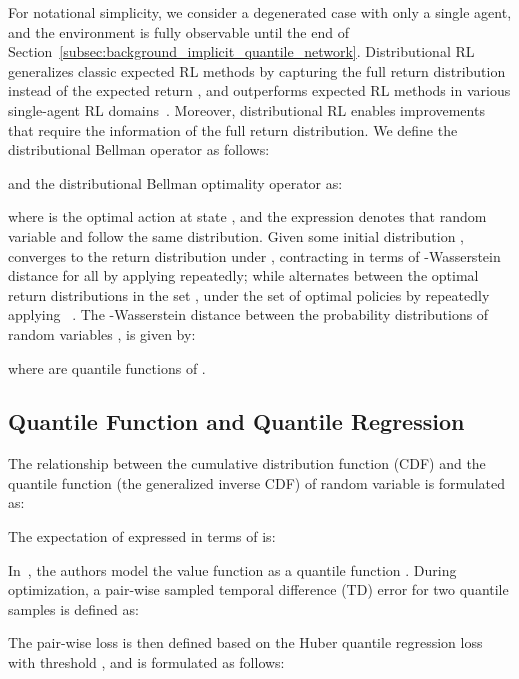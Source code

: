\documentclass{article}
\begin{document}
For notational simplicity, we consider a degenerated case with only a single agent, and the environment is fully observable until the end of Section~\ref{subsec:background_implicit_quantile_network}. Distributional RL generalizes classic expected RL methods by capturing the full return distribution  instead of the expected return , and outperforms expected RL methods in various single-agent RL domains~\cite{Bellemare2017C51,Bellemare2019S51,Dabney2018QR-DQN,Dabney2018IQN,Rowland2019ER-DQN,Yang2019FQF}. Moreover, distributional RL enables improvements~\cite{Nikolov2019IDS,Zhang2019QUOTA,Mavrin2019DLTV} that require the information of the full return distribution. We define the distributional Bellman operator  as follows:

and the distributional Bellman optimality operator  as:

where  is the optimal action at state , and the expression  denotes that random variable  and  follow the same distribution. Given some initial distribution ,  converges to the return distribution  under , contracting in terms of -Wasserstein distance for all  by applying  repeatedly; while  alternates between the optimal return distributions in the set , under the set of optimal policies  by repeatedly applying ~\cite{Bellemare2017C51}. The -Wasserstein distance  between the probability distributions of random variables ,  is given by:

where  are quantile functions of .



\subsection{Quantile Function and Quantile Regression}
\label{subsec:background_quantile_function_and_quantile_regression}

The relationship between the cumulative distribution function (CDF)  and the quantile function  (the generalized inverse CDF) of random variable  is formulated as:

The expectation of  expressed in terms of  is:

In~\cite{Dabney2018QR-DQN}, the authors model the value function as a quantile function . During optimization, a pair-wise sampled temporal difference (TD) error  for two quantile samples  is defined as:

The pair-wise loss  is then defined based on the Huber quantile regression loss ~\cite{Dabney2018QR-DQN} with threshold , and is formulated as follows:
\end{document}
